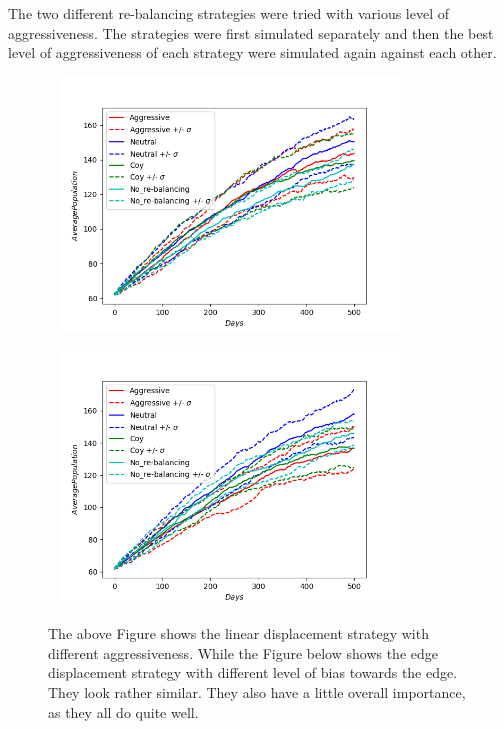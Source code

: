 The two different re-balancing strategies were tried with various level of aggressiveness. The strategies were first simulated separately and then the best level of aggressiveness of each strategy were simulated again against each other.

\begin{figure}[!htb]
	\hspace*{-0.7cm}\
	\centering
	\includegraphics[width=9cm]{images/histories_linear.png}
	\label{fig:linear}
	\hspace*{2mm} 
\end{figure}
\vspace*{-1cm}
\begin{figure}[!htb]
	\hspace*{-0.7cm}\
	\centering
	\includegraphics[width=9cm]{images/histories_edge.png}
	\caption{ The above Figure shows the linear displacement strategy with different aggressiveness. While the Figure below shows the edge displacement strategy with different level of bias towards the edge. They look rather similar. They also have a little overall importance, as they all do quite well.
	}
	\label{fig:edge}
	\hspace*{2mm} 
\end{figure}

